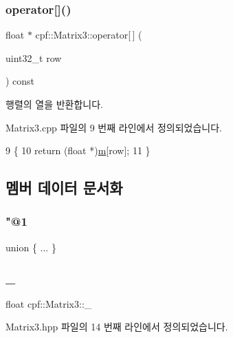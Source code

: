 \subsubsection{\texorpdfstring{operator[]()}{operator[]()}}
{\footnotesize\ttfamily float $\ast$ cpf\+::\+Matrix3\+::operator\mbox{[}$\,$\mbox{]} (\begin{DoxyParamCaption}\item[{uint32\+\_\+t}]{row }\end{DoxyParamCaption}) const}

행렬의 열을 반환합니다. 

Matrix3.\+cpp 파일의 9 번째 라인에서 정의되었습니다.


\begin{DoxyCode}
9                                                  \{
10         \textcolor{keywordflow}{return} (\textcolor{keywordtype}{float} *)\hyperlink{classcpf_1_1_matrix3_a544955e219e5edd0c933f5e83dde9fac}{m}[row];
11     \}
\end{DoxyCode}


\subsection{멤버 데이터 문서화}
\mbox{\label{classcpf_1_1_matrix3_a7c6f4a6b07cf19c9b59222cc3cfb69d4}} 
\subsubsection{\texorpdfstring{"@1}{@1}}
{\footnotesize\ttfamily union \{ ... \} \hspace{0.3cm}{\ttfamily [private]}}

\mbox{\label{classcpf_1_1_matrix3_aaa10854cee95f07b839a5541c3b7bee6}} 
\subsubsection{\texorpdfstring{\+\_}{\_11}}
{\footnotesize\ttfamily float cpf\+::\+Matrix3\+::\+\_}



Matrix3.\+hpp 파일의 14 번째 라인에서 정의되었습니다.

\mbox{\label{classcpf_1_1_matrix3_afa4bd5eff75ce61cb5d1bc7665afc933}} 
